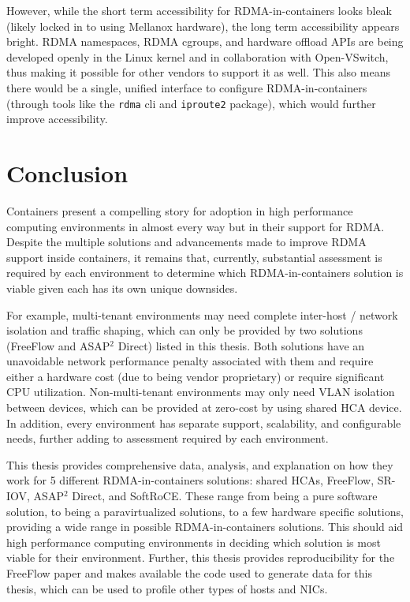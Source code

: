 \documentclass[12pt,titlepage]{article}
\begin{document}
However, while the short term accessibility for RDMA-in-containers looks bleak (likely locked in to using Mellanox hardware), the long term accessibility appears bright.
RDMA namespaces, RDMA cgroups, and hardware offload APIs are being developed openly in the Linux kernel and in collaboration with Open-VSwitch, thus making it possible for other vendors to support it as well.
This also means there would be a single, unified interface to configure RDMA-in-containers (through tools like the \texttt{rdma} cli and \texttt{iproute2} package), which would further improve accessibility.


\section{Conclusion}
Containers present a compelling story for adoption in high performance computing environments in almost every way but in their support for RDMA\@.
Despite the multiple solutions and advancements made to improve RDMA support inside containers, it remains that, currently, substantial assessment is required by each environment to determine which RDMA-in-containers solution is viable given each has its own unique downsides.

For example, multi-tenant environments may need complete inter-host / network isolation and traffic shaping, which can only be provided by two solutions (FreeFlow and ASAP$^2$ Direct) listed in this thesis.
Both solutions have an unavoidable network performance penalty associated with them and require either a hardware cost (due to being vendor proprietary) or require significant CPU utilization.
Non-multi-tenant environments may only need VLAN isolation between devices, which can be provided at zero-cost by using shared HCA device.
In addition, every environment has separate support, scalability, and configurable needs, further adding to assessment required by each environment.

This thesis provides comprehensive data, analysis, and explanation on how they work for 5 different RDMA-in-containers solutions: shared HCAs, FreeFlow, SR-IOV, ASAP$^2$ Direct, and SoftRoCE\@.
These range from being a pure software solution, to being a paravirtualized solutions, to a few hardware specific solutions, providing a wide range in possible RDMA-in-containers solutions.
This should aid high performance computing environments in deciding which solution is most viable for their environment.
Further, this thesis provides reproducibility for the FreeFlow paper and makes available the code used to generate data for this thesis, which can be used to profile other types of hosts and NICs.
\end{document}
